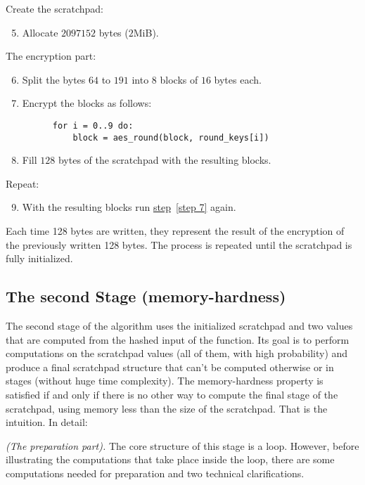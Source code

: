 \noindent Create the scratchpad:
\begin{enumerate}
  \setcounter{enumi}{4}
  \item Allocate $2097152$ bytes ($2$MiB).
\end{enumerate}
\noindent The encryption part:
\begin{enumerate}
  \setcounter{enumi}{5}
  \item Split the bytes $64$ to $191$ into $8$ blocks of $16$ bytes each.
  \item \label{step 7} Encrypt the blocks as follows:
    \begin{verbatim}
      for i = 0..9 do:
          block = aes_round(block, round_keys[i])
    \end{verbatim}
\end{enumerate}
\begin{enumerate}
  \setcounter{enumi}{7}
  \item Fill $128$ bytes of the scratchpad with the resulting blocks.
\end{enumerate}
\noindent Repeat:
\begin{enumerate}
  \setcounter{enumi}{8}
  \item With the resulting blocks run \hyperref[step 7]{step}~\ref{step 7} again.
\end{enumerate}
%
Each time 128 bytes are written, they represent the
result of the encryption of the previously written 128 bytes. The
process is repeated until the scratchpad is fully initialized.

\subsection{The second Stage (memory-hardness)}
The second stage of the algorithm uses the initialized scratchpad and two values that are computed from the hashed input of the function. Its goal is to perform computations on the scratchpad values (all of them, with high probability) and produce a final scratchpad structure that can't be computed otherwise or in stages (without huge time complexity). The memory-hardness property is satisfied if and only if there is no other way to compute the final stage of the scratchpad, using memory less than the size of the scratchpad. That is the intuition. In detail:

\noindent \emph{(The preparation part).} The core structure of this stage is a loop. However, before illustrating the computations that take place inside the loop, there are some computations needed for preparation and two technical clarifications.

